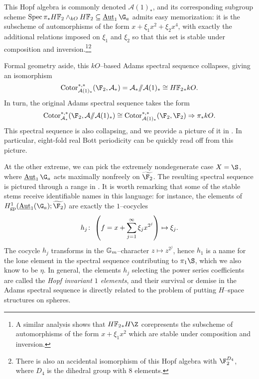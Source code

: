 \begin{example}
\begin{center}
\end{center}
This Hopf algebra is commonly denoted $\mathcal A(1)_*$, and its corresponding subgroup scheme $\Spec \pi_* \HFtwo \sm_{kO} \HFtwo \subseteq \InternalAut_1 \G_a$ admits easy memorization: it is the subscheme of automorphisms of the form $x + \xi_1 x^2 + \xi_2 x^4$, with exactly the additional relations imposed on $\xi_1$ and $\xi_2$ so that this set is stable under composition and inversion.\footnote{A similar analysis shows that $\HFtwo_* H\Z$ corepresents the subscheme of automorphisms of the form $x + \xi_1 x^2$ which are stable under composition and inversion.}\footnote{There is also an accidental isomorphism of this Hopf algebra with $\F_2^{D_4}$, where $D_4$ is the dihedral group with $8$ elements.}

Formal geometry aside, this $kO$--based Adams spectral sequence collapses, giving an isomorphism \[\Cotor^{*, *}_{\mathcal A(1)_*}(\F_2, \mathcal A_*) = \mathcal A_* \mmod \mathcal A(1)_* \cong \HFtwo_* kO.\]  In turn, the original Adams spectral sequence takes the form \[\Cotor^{*, *}_{\mathcal A_*}(\F_2, \mathcal A \mmod \mathcal A(1)_*) \cong \Cotor^{*, *}_{\mathcal A(1)_*}(\F_2, \F_2) \Rightarrow \pi_* kO.\]  This spectral sequence is also collapsing, and we provide a picture of it in .  In particular, eight-fold real Bott periodicity can be quickly read off from this picture.
\end{example}

\begin{example}
At the other extreme, we can pick the extremely nondegenerate case $X = \S$, where $\InternalAut_1 \G_a$ acts maximally nonfreely on $\widetilde{\F_2}$.  The resulting spectral sequence is pictured through a range in .  It is worth remarking that some of the stable stems receive identifiable names in this language: for instance, the elements of $H^1_{\mathrm{gp}}(\InternalAut_1(\G_a); \widetilde{\F_2})$ are exactly the $1$--cocycles \[h_j\colon\thinspace \left( f = x + \sum_{j=1}^\infty \xi_j x^{2^j}\right) \mapsto \xi_j.\]  The cocycle $h_j$ transforms in the $\mathbb G_m$--character $z \mapsto z^{2^j}$, hence $h_1$ is a name for the lone element in the spectral sequence contributing to $\pi_1 \S$, which we also know to be $\eta$.  In general, the elements $h_j$ selecting the power series coefficients are called the \textit{Hopf invariant $1$ elements}, and their survival or demise in the Adams spectral sequence is directly related to the problem of putting $H$--space structures on spheres.
\end{example}

